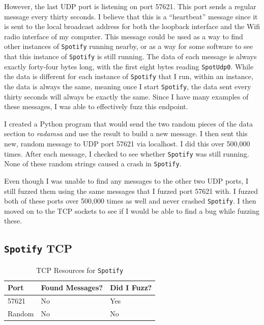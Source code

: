 However, the last UDP port is listening on port 57621.  This port sends a regular message every thirty seconds.  I believe that this is a ``heartbeat'' message since it is sent to the local broadcast address for both the loopback interface and the Wifi radio interface of my computer.  This message could be used as a way to find other instances of \texttt{Spotify} running nearby, or as a way for some software to see that this instance of \texttt{Spotify} is still running.  The data of each message is always exactly forty-four bytes long, with the first eight bytes reading \texttt{SpotUdp0}.  While the data is different for each instance of \texttt{Spotify} that I run, within an instance, the data is always the same, meaning once I start \texttt{Spotify}, the data sent every thirty seconds will always be exactly the same.  Since I have many examples of these messages, I was able to effectively fuzz this endpoint.

I created a Python program that would send the two random pieces of the data section to \textit{radamsa} and use the result to build a new message.  I then sent this new, random message to UDP port 57621 via localhost.  I did this over 500,000 times.  After each message, I checked to see whether \texttt{Spotify} was still running.  None of these random strings caused a crash in \texttt{Spotify}.

Even though I was unable to find any messages to the other two UDP ports, I still fuzzed them using the same messages that I fuzzed port 57621 with.  I fuzzed both of these ports over 500,000 times as well and never crashed \texttt{Spotify}.  I then moved on to the TCP sockets to see if I would be able to find a bug while fuzzing these.

\subsection{\texttt{Spotify} TCP}
\label{sec:spotifyTcp}

\begin{table}
\centering
\begin{normalsize}
\begin{tabular}{ l | l | l }
\textbf{Port} & \textbf{Found Messages?} & \textbf{Did I Fuzz?} \\ \hline
57621 & No & Yes \\ \hline
Random & No & No \\ \hline
\end{tabular}
\caption{TCP Resources for \texttt{Spotify}}
\label{tab:SpotifyTcpTab}
\end{normalsize}
\end{table}

